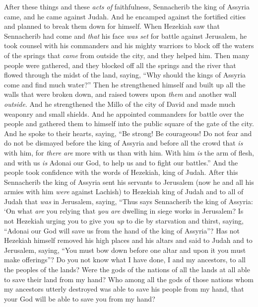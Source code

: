 \begin{biblechapter} %
 After these things and these \textit{acts of} faithfulness, Sennacherib the king of Assyria came, and he came against Judah. And he encamped against the fortified cities and planned to break them down for himself.
\verse When Hezekiah saw that Sennacherib had come and \textit{that} his face \textit{was set} for battle against Jerusalem,
\verse he took counsel with his commanders and his mighty warriors to block off the waters of the springs that \textit{came} from outside the city, and they helped him.
\verse Then many people were gathered, and they blocked off all the springs and the river that flowed through the midst of the land, saying, “Why should the kings of Assyria come and find much water?”
\verse Then he strengthened himself and built up all the walls that were broken down, and raised towers upon \textit{them} and another wall \textit{outside}. And he strengthened the Millo of the city of David and made much weaponry and small shields.
\verse And he appointed commanders for battle over the people and gathered them to himself into the public square of the gate of the city. And he spoke to their hearts, saying,
\verse “Be strong! Be courageous! Do not fear and do not be dismayed before the king of Assyria and before all the crowd that \textit{is} with him, for \textit{there are} more with us than with him.
\verse With him \textit{is} the arm of flesh, and with us \textit{is} Adonai our God, to help us and to fight our battles.” And the people took confidence with the words of Hezekiah, king of Judah.
\verse After this Sennacherib the king of Assyria sent his servants to Jerusalem (now he and all his armies with him \textit{were} against Lachish) to Hezekiah king of Judah and to all of Judah that \textit{was} in Jerusalem, saying,
\verse “Thus says Sennacherib the king of Assyria: ‘On what \textit{are} you relying that \textit{you are} dwelling in siege works in Jerusalem?
\verse Is not Hezekiah urging you to give you \textit{up} to die by starvation and thirst, saying, “Adonai our God will save us from the hand of the king of Assyria”?
\verse Has not Hezekiah himself removed his high places and his altars and said to Judah and to Jerusalem, saying, “You must bow down before one altar and upon it you must make offerings”?
\verse Do you not know what I have done, I and my ancestors, to all the peoples of the lands? Were the gods of the nations of all the lands at all able to save their land from my hand?
\verse Who among all the gods of those nations whom my ancestors utterly destroyed was able to save his people from my hand, that your God will be able to save you from my hand?

\end{biblechapter}
